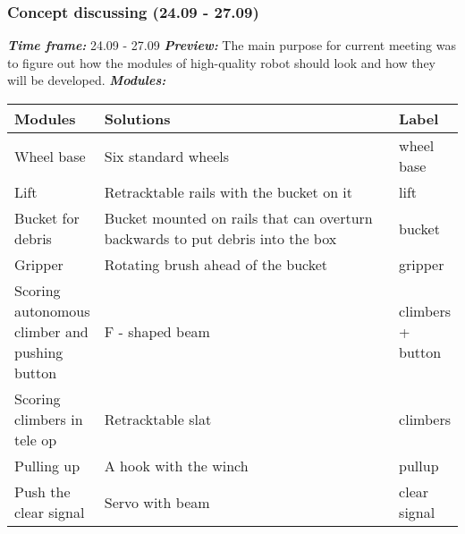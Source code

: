 \addtocounter{number_of_meeting}{1}
\subsubsection{Concept discussing (24.09 - 27.09)}
\textit{\textbf{Time frame:}} 24.09 - 27.09 \newline
\textit{\textbf{Preview:}} The main purpose for current meeting was to figure out how the modules of high-quality robot should look and how they will be developed. \newline \newline
\textit{\textbf{Modules:}}

\begin{table}[H]
	\vspace{-2mm}
	\begin{center}
		\begin{tabular}{|p{0.2\linewidth}|p{0.7\linewidth}|p{0.1\linewidth}|}
			\hline
			Modules & Solutions & Label \\
			\hline
			Wheel base & Six standard wheels & wheel base \\
			\hline
			Lift & Retracktable rails with the bucket on it & lift \\
			\hline
			Bucket for debris & Bucket mounted on rails that can overturn backwards to put debris into the box & bucket \\
			\hline
			Gripper & Rotating brush ahead of the bucket & gripper\\
			\hline
			Scoring autonomous climber and pushing button & F - shaped beam & climbers + button\\
			\hline
			Scoring climbers in tele op & Retracktable slat & climbers\\
			\hline
			Pulling up & A hook with the winch & pullup\\
			\hline
			Push the clear signal & Servo with beam & clear signal\\
			\hline
		\end{tabular}
	\end{center}
\end{table}

